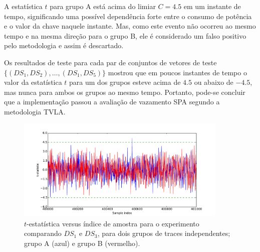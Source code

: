A estatística $t$ para grupo A está acima do limiar $C = 4.5$ em um instante de tempo, significando uma possível dependência forte entre o consumo de potência e o valor da chave naquele instante. Mas, como este evento não ocorreu ao mesmo tempo e na mesma direção para o grupo B, ele é considerado um falso positivo pelo metodologia e assim é descartado.
%
%

Os resultados de teste para cada par de conjuntos de vetores de teste $ \{(DS_1,DS_2), \dots, (DS_1,DS_5) \}$ mostrou que em poucos instantes de tempo o valor da estatística $t$ para um dos grupos esteve acima de $4.5$ ou abaixo de $-4.5$, mas nunca para ambos os grupos ao mesmo tempo.
%
Portanto, pode-se concluir que a implementação passou a avaliação de vazamento SPA segundo a metodologia TVLA.

\begin{figure}[htb]
	\centering
	\centerline{
		\includegraphics[width=0.9\textwidth]{figures/graph__t_statistic__x__sample_index_for_groups_A_and_B__pair_DS1_DS3-eps-converted-to.pdf}
	}
	\caption{
		$t$-estatística versus índice de amostra para o experimento comparando $DS_1$ e $DS_3$, para dois grupos de traces independentes; grupo A (azul) e grupo B (vermelho).
	}
	\label{fig:graph__t_statistic__x__sample_index_for_groups_A_and_B__pair_DS1_DS3}
\end{figure}